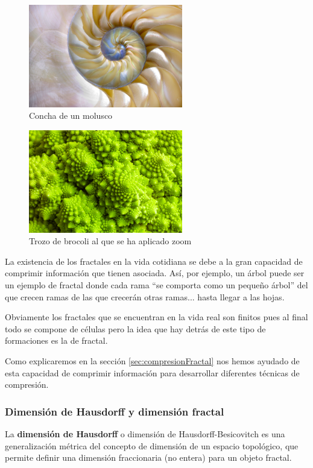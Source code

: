 \begin{figure}[hbtp]
\centering
\includegraphics[width = 0.6\textwidth]{img/concha.jpg}
\caption{Concha de un molusco}
\label{fig:concha}
\end{figure}

\begin{figure}[hbtp]
\centering
\includegraphics[width = 0.6\textwidth]{img/brocoli.jpg}
\caption{Trozo de brocoli al que se ha aplicado zoom}
\label{fig:brocoli}
\end{figure}

La existencia de los fractales en la vida cotidiana se debe a la gran capacidad de comprimir información que tienen asociada. Así, por ejemplo, un árbol puede ser un ejemplo de fractal donde cada rama ``se comporta como un pequeño árbol'' del que crecen ramas de las que crecerán otras ramas... hasta llegar a las hojas.

Obviamente los fractales que se encuentran en la vida real son finitos pues al final todo se compone de células pero la idea que hay detrás de este tipo de formaciones es la de fractal.

Como explicaremos en la sección \ref{sec:compresionFractal} nos hemos ayudado de esta capacidad de comprimir información para desarrollar diferentes técnicas de compresión.

\subsubsection{Dimensión de Hausdorff y dimensión fractal}
\begin{definition}
La \textbf{dimensión de Hausdorff} o dimensión de Hausdorff-Besicovitch es una generalización métrica del concepto de dimensión de un espacio topológico, que permite definir una dimensión fraccionaria (no entera) para un objeto fractal.
\end{definition}

